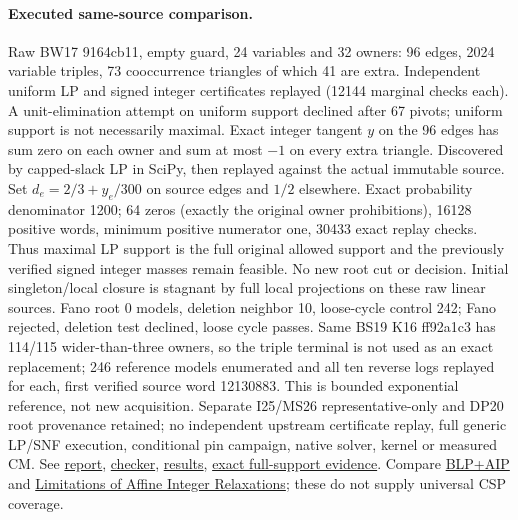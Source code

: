 \documentclass[11pt]{article}
\begin{document}
\paragraph{Executed same-source comparison.}
Raw BW17 9164cb11, empty guard, 24 variables and 32 owners: 96 edges, 2024 variable triples, 73 cooccurrence triangles of which 41 are extra. Independent uniform LP and signed integer certificates replayed (12144 marginal checks each). A unit-elimination attempt on uniform support declined after 67 pivots; uniform support is not necessarily maximal. Exact integer tangent $y$ on the 96 edges has sum zero on each owner and sum at most $-1$ on every extra triangle. Discovered by capped-slack LP in SciPy, then replayed against the actual immutable source. Set $d_e=2/3+y_e/300$ on source edges and $1/2$ elsewhere. Exact probability denominator 1200; 64 zeros (exactly the original owner prohibitions), 16128 positive words, minimum positive numerator one, 30433 exact replay checks. Thus maximal LP support is the full original allowed support and the previously verified signed integer masses remain feasible. No new root cut or decision. Initial singleton/local closure is stagnant by full local projections on these raw linear sources. Fano root 0 models, deletion neighbor 10, loose-cycle control 242; Fano rejected, deletion test declined, loose cycle passes. Same BS19 K16 ff92a1c3 has 114/115 wider-than-three owners, so the triple terminal is not used as an exact replacement; 246 reference models enumerated and all ten reverse logs replayed for each, first verified source word 12130883. This is bounded exponential reference, not new acquisition. Separate I25/MS26 representative-only and DP20 root provenance retained; no independent upstream certificate replay, full generic LP/SNF execution, conditional pin campaign, native solver, kernel or measured CM. See \href{https://github.com/j15marti/pnp/commit/78f30c16d1a15adc1242414b428de2cd63e6d959}{report}, \href{https://github.com/j15marti/pnp/commit/90e1a49e8dbab7b0f5f66a3dc841cc91dfe7cce2}{checker}, \href{https://github.com/j15marti/pnp/commit/70d087a897ac5f63bd0f930f7cecdae9e0e9394f}{results}, \href{https://github.com/j15marti/pnp/commit/b73ce8b4e1f94382678d3145ab62ba315ff8d5dc}{exact full-support evidence}. Compare \href{https://doi.org/10.1137/20M1312745}{BLP+AIP} and \href{https://arxiv.org/abs/2407.09097}{Limitations of Affine Integer Relaxations}; these do not supply universal CSP coverage.
\end{document}
